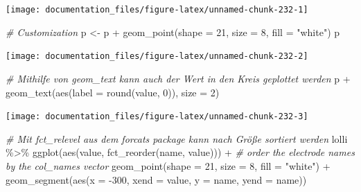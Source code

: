 \documentclass[
]{article}
\newenvironment{Shaded}{\begin{snugshade}}{\end{snugshade}}
\newcommand{\AttributeTok}[1]{\textcolor[rgb]{0.77,0.63,0.00}{#1}}
\newcommand{\CommentTok}[1]{\textcolor[rgb]{0.56,0.35,0.01}{\textit{#1}}}
\newcommand{\DecValTok}[1]{\textcolor[rgb]{0.00,0.00,0.81}{#1}}
\newcommand{\FunctionTok}[1]{\textcolor[rgb]{0.00,0.00,0.00}{#1}}
\newcommand{\NormalTok}[1]{#1}
\newcommand{\OtherTok}[1]{\textcolor[rgb]{0.56,0.35,0.01}{#1}}
\newcommand{\SpecialCharTok}[1]{\textcolor[rgb]{0.00,0.00,0.00}{#1}}
\newcommand{\StringTok}[1]{\textcolor[rgb]{0.31,0.60,0.02}{#1}}
\begin{document}
\begin{center}\texttt{[image: documentation\_files/figure-latex/unnamed-chunk-232-1]} \end{center}

\begin{Shaded}
\begin{Highlighting}[]
\CommentTok{\# Customization }
\NormalTok{p }\OtherTok{\textless{}{-}}\NormalTok{ p }\SpecialCharTok{+} \FunctionTok{geom\_point}\NormalTok{(}\AttributeTok{shape =} \DecValTok{21}\NormalTok{, }\AttributeTok{size =} \DecValTok{8}\NormalTok{, }\AttributeTok{fill =} \StringTok{"white"}\NormalTok{)}
\NormalTok{p}
\end{Highlighting}
\end{Shaded}

\begin{center}\texttt{[image: documentation\_files/figure-latex/unnamed-chunk-232-2]} \end{center}

\begin{Shaded}
\begin{Highlighting}[]
\CommentTok{\# Mithilfe von geom\_text kann auch der Wert in den Kreis geplottet werden}
\NormalTok{p }\SpecialCharTok{+} \FunctionTok{geom\_text}\NormalTok{(}\FunctionTok{aes}\NormalTok{(}\AttributeTok{label =} \FunctionTok{round}\NormalTok{(value, }\DecValTok{0}\NormalTok{)), }\AttributeTok{size =} \DecValTok{2}\NormalTok{)}
\end{Highlighting}
\end{Shaded}

\begin{center}\texttt{[image: documentation\_files/figure-latex/unnamed-chunk-232-3]} \end{center}

\begin{Shaded}
\begin{Highlighting}[]
\CommentTok{\# Mit fct\_relevel aus dem forcats package kann nach Größe sortiert werden}
\NormalTok{lolli }\SpecialCharTok{\%\textgreater{}\%}
  \FunctionTok{ggplot}\NormalTok{(}\FunctionTok{aes}\NormalTok{(value, }\FunctionTok{fct\_reorder}\NormalTok{(name, value))) }\SpecialCharTok{+} \CommentTok{\# order the electrode names by the col\_names vector}
  \FunctionTok{geom\_point}\NormalTok{(}\AttributeTok{shape =} \DecValTok{21}\NormalTok{, }\AttributeTok{size =} \DecValTok{8}\NormalTok{, }\AttributeTok{fill =} \StringTok{"white"}\NormalTok{) }\SpecialCharTok{+}
  \FunctionTok{geom\_segment}\NormalTok{(}\FunctionTok{aes}\NormalTok{(}\AttributeTok{x =} \SpecialCharTok{{-}}\DecValTok{300}\NormalTok{, }\AttributeTok{xend =}\NormalTok{ value, }\AttributeTok{y =}\NormalTok{ name, }\AttributeTok{yend =}\NormalTok{ name))}
\end{Highlighting}
\end{Shaded}
\end{document}

